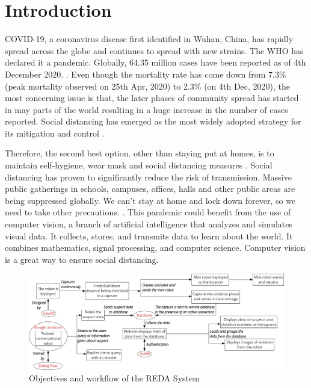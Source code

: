 \documentclass[AMA,STIX1COL]{WileyNJD-v2}
\begin{document}
\section{Introduction}\label{sec1}


COVID-19, a coronavirus disease first identified in Wuhan, China, has rapidly spread across the globe and continues to spread with new strains. The WHO has declared it a pandemic. Globally, 64.35 million cases have been reported as of 4th December 2020. \cite{b1}. Even though the mortality rate has come down from 7.3\% (peak mortality observed on 25th Apr, 2020) to 2.3\% (on 4th Dec, 2020)\cite{b2}, the most concerning issue is that, the later phases of community spread has started in may parts of the world resulting in a huge increase in the number of cases reported. Social distancing has emerged as the most widely adopted strategy for its mitigation and control \cite{b3}.

Therefore, the second best option. other than staying put at homes, is to maintain self-hygiene, wear mask and social distancing measures \cite{b4}. Social distancing has proven to significantly reduce the risk of transmission. Massive public gatherings in schools, campuses, offices, halls and other public areas are being suppressed globally. We can't stay at home and lock down forever, so we need to take other precautions. \cite{b5}. This pandemic could benefit from the use of computer vision, a branch of artificial intelligence that analyzes and simulates visual data. It collects, stores, and transmits data to learn about the world. It combines mathematics, signal processing, and computer science. Computer vision is a great way to ensure social distancing.

\begin{figure}[t]
\centerline{\includegraphics[width=1\textwidth]{obj_c.png}}
\caption{Objectives and workflow of the REDA System}
\label{fig1}
\end{figure}
\end{document}
